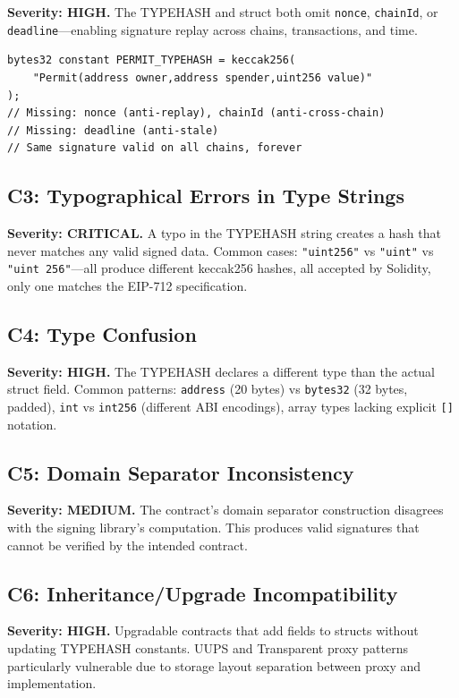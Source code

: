 \documentclass[runningheads]{llncs}
\begin{document}
\textbf{Severity: HIGH.} The TYPEHASH and struct both omit \texttt{nonce}, \texttt{chainId}, or \texttt{deadline}---enabling signature replay across chains, transactions, and time.

\begin{lstlisting}[caption={VULNERABLE: No replay protection fields}]
bytes32 constant PERMIT_TYPEHASH = keccak256(
    "Permit(address owner,address spender,uint256 value)"
);
// Missing: nonce (anti-replay), chainId (anti-cross-chain)
// Missing: deadline (anti-stale)
// Same signature valid on all chains, forever
\end{lstlisting}

\subsection{C3: Typographical Errors in Type Strings}

\textbf{Severity: CRITICAL.} A typo in the TYPEHASH string creates a hash that never matches any valid signed data. Common cases: \texttt{"uint256"} vs \texttt{"uint"} vs \texttt{"uint 256"}---all produce different keccak256 hashes, all accepted by Solidity, only one matches the EIP-712 specification.

\subsection{C4: Type Confusion}

\textbf{Severity: HIGH.} The TYPEHASH declares a different type than the actual struct field. Common patterns: \texttt{address} (20 bytes) vs \texttt{bytes32} (32 bytes, padded), \texttt{int} vs \texttt{int256} (different ABI encodings), array types lacking explicit \texttt{[]} notation.

\subsection{C5: Domain Separator Inconsistency}

\textbf{Severity: MEDIUM.} The contract's domain separator construction disagrees with the signing library's computation. This produces valid signatures that cannot be verified by the intended contract.

\subsection{C6: Inheritance/Upgrade Incompatibility}

\textbf{Severity: HIGH.} Upgradable contracts that add fields to structs without updating TYPEHASH constants. UUPS and Transparent proxy patterns particularly vulnerable due to storage layout separation between proxy and implementation.
\end{document}
